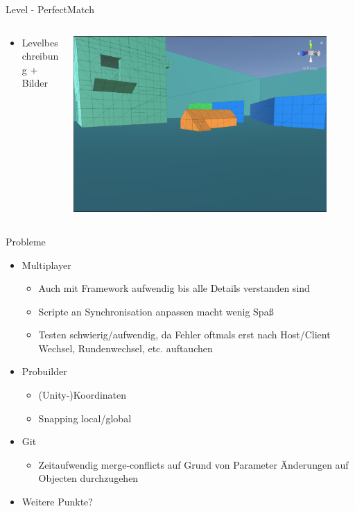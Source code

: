 \documentclass[xcolor=dvipsnames]{beamer}
\begin{document}
\begin{frame}{Level - PerfectMatch}
\begin{columns}
\begin{column}{0.5\textwidth}
	\begin{itemize}
		\item Levelbeschreibung + Bilder 
	\end{itemize}
\end{column}
\begin{column}{0.5\textwidth} 
	\begin{center}
		\includegraphics[width=0.9\textwidth]{Level_view.png}
	\end{center}
\end{column}
\end{columns}
\end{frame}

\begin{frame}{Probleme}
\begin{itemize}
 \item Multiplayer 
 	\begin{itemize}
 		\item Auch mit Framework aufwendig bis alle Details verstanden sind
 		\item Scripte an Synchronisation anpassen macht wenig Spaß
 		\item Testen schwierig/aufwendig, da Fehler oftmals erst nach Host/Client Wechsel, Rundenwechsel, etc. auftauchen
 	\end{itemize}
 \item Probuilder
 	\begin{itemize}
 		\item (Unity-)Koordinaten 
 		\item Snapping local/global
 	\end{itemize}
  \item Git
 	\begin{itemize}
 		\item Zeitaufwendig merge-conflicts auf Grund von Parameter Änderungen auf Objecten durchzugehen
 	\end{itemize}
  \item Weitere Punkte?
\end{itemize}
	
\end{frame}
\end{document}
